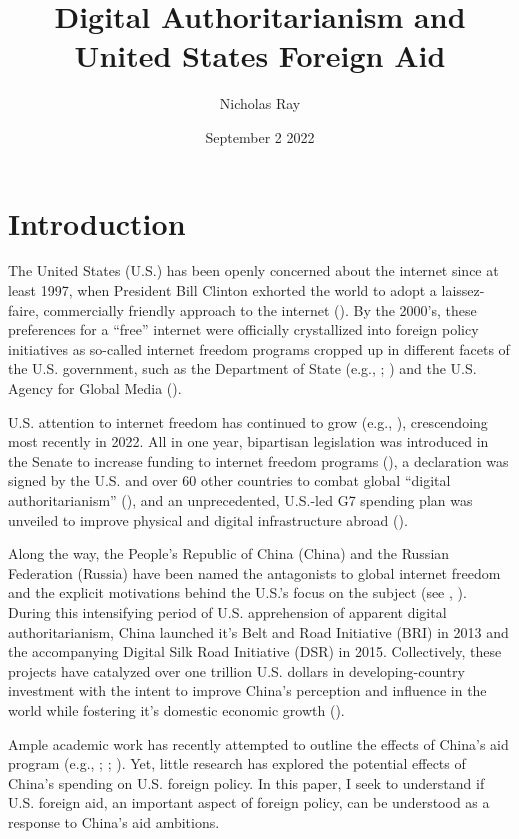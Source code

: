 \documentclass{article}
\title{\vspace{-2cm}Digital Authoritarianism and United States Foreign Aid\vspace{-0.5cm}}
\author{Nicholas Ray}
\date{\vspace{-0.5cm}September 2 2022\vspace{-1cm}}
\begin{document}
\maketitle
\section*{Introduction}
The United States (U.S.) has been openly concerned about the internet since at least 1997, when President Bill Clinton exhorted the world to adopt a laissez-faire, commercially friendly approach to the internet (\cite{government1997}). By the 2000's, these preferences for a ``free'' internet were officially crystallized into foreign policy initiatives as so-called internet freedom programs cropped up in different facets of the U.S. government, such as the Department of State (e.g., \cite{henry2014}; \cite{government2021a}) and the U.S. Agency for Global Media (\cite{government2022}).

U.S. attention to internet freedom has continued to grow (e.g., \cite{government2010}), crescendoing most recently in 2022. All in one year, bipartisan legislation was introduced in the Senate to increase funding to internet freedom programs (\cite{government2022a}), a declaration was signed by the U.S. and over 60 other countries to combat global ``digital authoritarianism'' (\cite{government2022b}), and an unprecedented, U.S.-led G7 spending plan was unveiled to improve physical and digital infrastructure abroad (\cite{government2022c}). 

Along the way, the People's Republic of China (China) and the Russian Federation (Russia) have been named the antagonists to global internet freedom and the explicit motivations behind the U.S.'s focus on the subject (see \cite{government2010}, \cite{government2022b}). During this intensifying period of U.S. apprehension of apparent digital authoritarianism, China launched it's Belt and Road Initiative (BRI) in 2013 and the accompanying Digital Silk Road Initiative (DSR) in 2015. Collectively, these projects have catalyzed over one trillion U.S. dollars in developing-country investment with the intent to improve China's perception and influence in the world while fostering it's domestic economic growth (\cite{dreher2022}).

Ample academic work has recently attempted to outline the effects of China's aid program (e.g., \cite{blair2021}; \cite{eichenauer2021}; \cite{dreher2018}). Yet, little research has explored the potential effects of China's spending on U.S. foreign policy. In this paper, I seek to understand if U.S. foreign aid, an important aspect of foreign policy, can be understood as a response to China's aid ambitions. 
\end{document}
